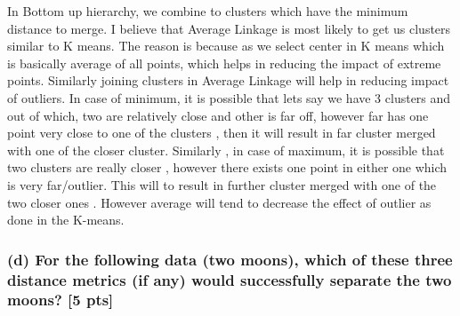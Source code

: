 \documentclass[twoside,10pt]{article}
\begin{document}
In Bottom up hierarchy, we combine to clusters which have the minimum distance to merge.  I believe that Average Linkage is most likely to get us clusters similar to K means. The reason is because as we select center in K means which is basically average of all points, which helps in reducing the impact of extreme points. Similarly  joining clusters in Average Linkage will help in reducing impact of outliers. In case of  minimum, it is possible that lets say we have 3 clusters and out of which, two are relatively close and other is far off, however far has one point very close to one of the clusters , then it will result in far cluster merged with one of the closer cluster. Similarly , in case of maximum, it is possible that two clusters are really closer , however there exists one point in either one which is very far/outlier. This will to result in further cluster merged  with one of the two closer ones .  However average will tend to decrease the effect of outlier as done in the K-means. \\

\subsubsection*{(d) For the following data (two moons), which of these three distance metrics (if any) would successfully separate the two moons? [5 pts]}
\end{document}
